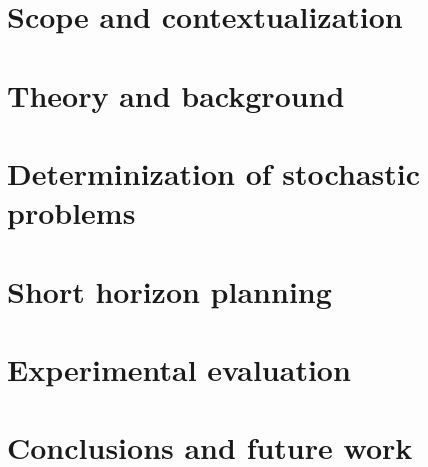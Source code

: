 \documentclass[11pt,a4paper,oldfontcommands,oneside]{memoir}
\begin{document}



\cleardoublepage


\cleardoublepage



\cleardoublepage


\setcounter{secnumdepth}{2}
\setcounter{tocdepth}{2}

\tableofcontents

\cleardoublepage


%

\chapter{Scope and contextualization}
\label{chap:scope}


\chapter{Theory and background}
\label{chap:theory}


\chapter{Determinization of stochastic problems}
\label{chap:determinization}


\chapter{Short horizon planning}
\label{chap:short-horizon-planning}


\chapter{Experimental evaluation}
\label{chap:experimental}


\chapter{Conclusions and future work}
\label{chap:conclusions}


\printbibliography
\end{document}

